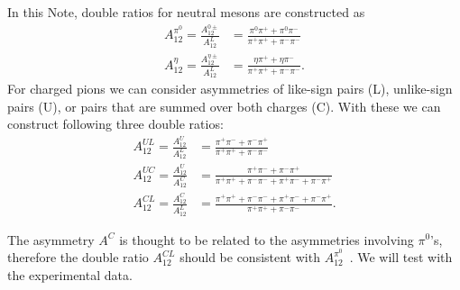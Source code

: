In this Note, double ratios for neutral mesons are constructed as
\begin{equation}
\label{eqn:FF6}
\begin{aligned}
A_{12}^{\pi^0}=\frac{A^{0\pm}_{12}}{A^L_{12}}&=\frac{\pi^0\pi^++\pi^0\pi^-}{\pi^+\pi^++\pi^-\pi^-}\\
A_{12}^{\eta}=\frac{A^{\eta\pm}_{12}}{A^L_{12}}&=\frac{\eta\pi^++\eta\pi^-}{\pi^+\pi^++\pi^-\pi^-}.
\end{aligned}
\end{equation}
For charged pions we can consider asymmetries of like-sign pairs (L), unlike-sign pairs (U), or pairs that are summed over both charges (C).
With these we can construct following three double ratios:
%
\begin{equation}
\label{eqn:FF7}
\begin{aligned}
A_{12}^{UL}=\frac{A^{U}_{12}}{A^L_{12}}&=\frac{\pi^+\pi^-+\pi^-\pi^+}{\pi^+\pi^++\pi^-\pi^-}\\
A_{12}^{UC}=\frac{A^{U}_{12}}{A^C_{12}}&=\frac{\pi^+\pi^-+\pi^-\pi^+}{\pi^+\pi^++\pi^-\pi^-+\pi^+\pi^-+\pi^-\pi^+}\\
A_{12}^{CL}=\frac{A^{C}_{12}}{A^L_{12}}&=\frac{\pi^+\pi^++\pi^-\pi^-+\pi^+\pi^-+\pi^-\pi^+}{\pi^+\pi^++\pi^-\pi^-}.
\end{aligned}
\end{equation}


The asymmetry $A^C$ is thought to be related to the asymmetries involving $\pi^0$'s, therefore the double ratio $A_{12}^{CL}$ should be consistent with $A_{12}^{\pi^0}$~\cite{Efremov:2006qm}. We will test with the experimental data.


